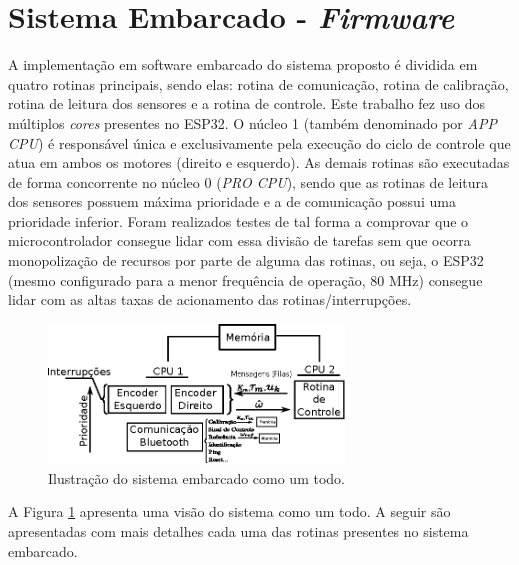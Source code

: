 \section{Sistema Embarcado - \emph{Firmware}}
\label{sec:sistema_embarcado}

A implementação em software embarcado do sistema proposto é dividida em quatro rotinas principais, sendo elas: rotina de comunicação, rotina de calibração, rotina de leitura dos sensores  e a rotina de controle. 
Este trabalho fez uso dos múltiplos \emph{cores} presentes no ESP32. 
O núcleo 1 (também denominado por \emph{APP CPU}) é responsável única e
exclusivamente  pela execução do ciclo de controle que atua em ambos os motores (direito e esquerdo). 
As demais rotinas são executadas de forma concorrente no núcleo 0 (\emph{PRO CPU}), sendo que as rotinas de leitura dos sensores possuem máxima prioridade e a de comunicação possui uma prioridade inferior. Foram realizados testes de tal forma a comprovar que o microcontrolador consegue lidar com essa 
divisão de tarefas sem que ocorra monopolização de recursos por parte de alguma das rotinas, ou seja, o ESP32 (mesmo configurado para a menor frequência de operação, 80 MHz) consegue lidar com as altas taxas de acionamento das rotinas/interrupções. 


\begin{figure}[H]
    \centering
    \includegraphics[width=0.7\textwidth]{figuras/ilustracoes/visao_geral_do_sistema.eps}
    \caption{Ilustração do sistema embarcado como um todo.}
    \label{fig:organizacao_firmware}
\end{figure}

A Figura \ref{fig:organizacao_firmware} apresenta uma visão do sistema como um todo. A seguir são apresentadas com mais detalhes cada uma das rotinas presentes no sistema embarcado.




